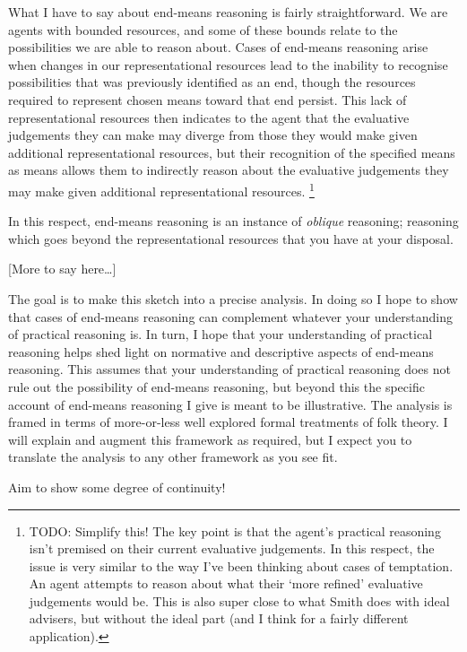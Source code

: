 \documentclass[10pt]{article}
\begin{document}
What I have to say about end-means reasoning is fairly straightforward.
We are agents with bounded resources, and some of these bounds relate to the possibilities we are able to reason about.
Cases of end-means reasoning arise when changes in our representational resources lead to the inability to recognise possibilities that was previously identified as an end, though the resources required to represent chosen means toward that end persist.
This lack of representational resources then indicates to the agent that the evaluative judgements they can make may diverge from those they would make given additional representational resources, but their recognition of the specified means as means allows them to indirectly reason about the evaluative judgements they may make given additional representational resources.\nolinebreak
\footnote{TODO: Simplify this! The key point is that the agent's practical reasoning isn't premised on their current evaluative judgements.
  In this respect, the issue is very similar to the way I've been thinking about cases of temptation.
  An agent attempts to reason about what their `more refined' evaluative judgements would be.
  This is also super close to what Smith does with ideal advisers, but without the ideal part (and I think for a fairly different application).
}

In this respect, end-means reasoning is an instance of \emph{oblique} reasoning; reasoning which goes beyond the representational resources that you have at your disposal.
\begin{center}
  [More to say here\dots]
\end{center}

The goal is to make this sketch into a precise analysis.
In doing so I hope to show that cases of end-means reasoning can complement whatever your understanding of practical reasoning is.
In turn, I hope that your understanding of practical reasoning helps shed light on normative and descriptive aspects of end-means reasoning.
This assumes that your understanding of practical reasoning does not rule out the possibility of end-means reasoning, but beyond this the specific account of end-means reasoning I give is meant to be illustrative.
The analysis is framed in terms of more-or-less well explored formal treatments of folk theory.
I will explain and augment this framework as required, but I expect you to translate the analysis to any other framework as you see fit.


Aim to show some degree of continuity!
\end{document}
